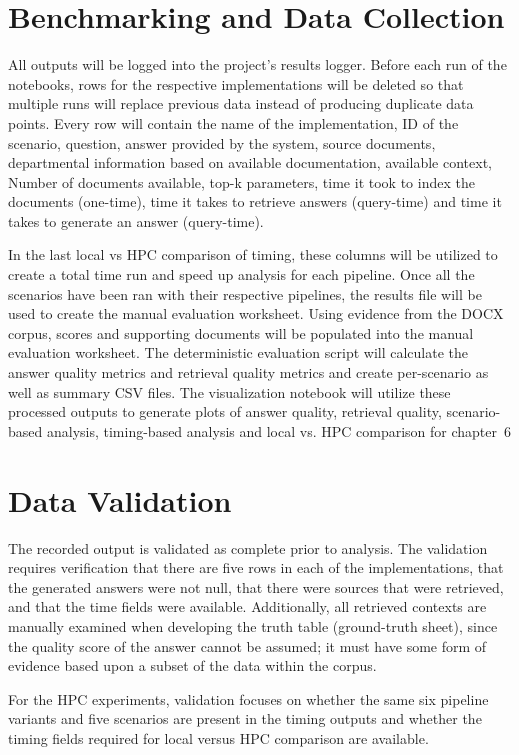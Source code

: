 \section{Benchmarking and Data Collection}

All outputs will be logged into the project’s results logger. Before each run of the notebooks, rows for the respective implementations will be deleted so that multiple runs will replace previous data instead of producing duplicate data points. Every row will contain the name of the implementation, ID of the scenario, question, answer provided by the system, source documents, departmental information based on available documentation, available context, Number of documents available, top-k parameters, time it took to index the documents (one-time), time it takes to retrieve answers (query-time) and time it takes to generate an answer (query-time).

In the last local vs HPC comparison of timing, these columns will be utilized to create a total time run and speed up analysis for each pipeline. Once all the scenarios have been ran with their respective pipelines, the results file will be used to create the manual evaluation worksheet. Using evidence from the DOCX corpus, scores and supporting documents will be populated into the manual evaluation worksheet. The deterministic evaluation script will calculate the answer quality metrics and retrieval quality metrics and create per-scenario as well as summary CSV files. The visualization notebook will utilize these processed outputs to generate plots of answer quality, retrieval quality, scenario-based analysis, timing-based analysis and local vs. HPC comparison for chapter~6

\section{Data Validation}

The recorded output is validated as complete prior to analysis. The validation requires verification that there are five rows in each of the implementations, that the generated answers were not null, that there were sources that were retrieved, and that the time fields were available. Additionally, all retrieved contexts are manually examined when developing the truth table (ground-truth sheet), since the quality score of the answer cannot be assumed; it must have some form of evidence based upon a subset of the data within the corpus.

For the \ac{HPC} experiments, validation focuses on whether the same six pipeline variants and five scenarios are present in the timing outputs and whether the timing fields required for local versus \ac{HPC} comparison are available.

